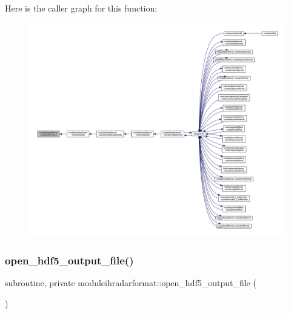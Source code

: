 Here is the caller graph for this function\+:\nopagebreak
\begin{figure}[H]
\begin{center}
\leavevmode
\includegraphics[width=350pt]{namespacemoduleihradarformat_a940aa69f596041c70dab62721c97072f_icgraph}
\end{center}
\end{figure}
\mbox{\label{namespacemoduleihradarformat_a923e50f44a04ab5c716a0a2526b165e1}} 
\subsubsection{\texorpdfstring{open\+\_\+hdf5\+\_\+output\+\_\+file()}{open\_hdf5\_output\_file()}}
{\footnotesize\ttfamily subroutine, private moduleihradarformat\+::open\+\_\+hdf5\+\_\+output\+\_\+file (\begin{DoxyParamCaption}{ }\end{DoxyParamCaption})\hspace{0.3cm}{\ttfamily [private]}}


